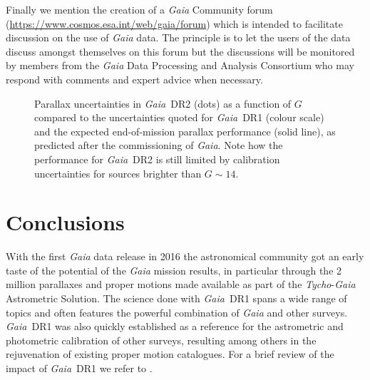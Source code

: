 \documentclass[longauth]{aa_gaia} %
\newcommand\gaia{\textit{Gaia}}
\newcommand\gdr[1]{\gaia~DR#1}
\newcommand\tyc{\textit{Tycho}}
\begin{document}
Finally we mention the creation of a {\gaia} Community forum
(\url{https://www.cosmos.esa.int/web/gaia/forum}) which is intended to facilitate discussion on the
use of {\gaia} data. The principle is to let the users of the data discuss amongst themselves on
this forum but the discussions will be monitored by members from the {\gaia} Data Processing and
Analysis Consortium who may respond with comments and expert advice when necessary.

%
%

\begin{figure}[t]
  \caption{Parallax uncertainties in \gdr{2} (dots) as a function of $G$ compared to the
  uncertainties quoted for \gdr{1} (colour scale) and the expected end-of-mission parallax
  performance (solid line), as predicted after the commissioning of {\gaia}. Note how the
  performance for \gdr{2} is still limited by calibration uncertainties for sources brighter than
  $G\sim14$.\label{fig:dr2dr1sigvarpi}}
\end{figure}

\section{Conclusions}
\label{sec:conclusions}

With the first {\gaia} data release in 2016 the astronomical community got an early taste of the
potential of the {\gaia} mission results, in particular through the 2 million parallaxes and proper
motions made available as part of the {\tyc}-{\gaia} Astrometric Solution. The science done with
\gdr{1} spans a wide range of topics and often features the powerful combination of {\gaia} and
other surveys. \gdr{1} was also quickly established as a reference for the astrometric and
photometric calibration of other surveys, resulting among others in the rejuvenation of existing
proper motion catalogues. For a brief review of the impact of \gdr{1} we refer to
\cite{2017arXiv170901216B}.
\end{document}

